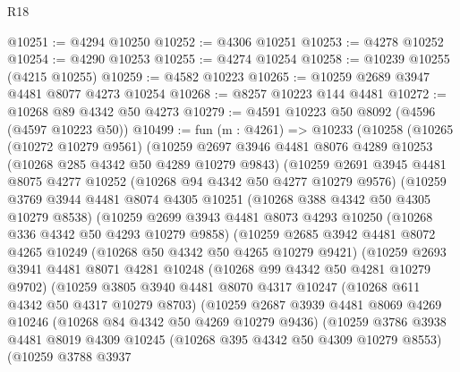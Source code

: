 \begin{lexlean}{R18}
\begin{coremodule}
@10251 := @4294 @10250
@10252 := @4306 @10251
@10253 := @4278 @10252
@10254 := @4290 @10253
@10255 := @4274 @10254
@10258 := @10239 @10255 (@4215 @10255)
@10259 := @4582 @10223
@10265 := @10259 @2689 @3947 @4481 @8077 @4273 @10254
@10268 := @8257 @10223 @144 @4481
@10272 := @10268 @89 @4342 @50 @4273
@10279 := @4591 @10223 @50 @8092 (@4596 (@4597 @10223 @50))
@10499 := fun (m : @4261) =>
  @10233
    (@10258
      (@10265
        (@10272 @10279 @9561)
        (@10259
          @2697
          @3946
          @4481
          @8076
          @4289
          @10253
          (@10268 @285 @4342 @50 @4289 @10279 @9843)
          (@10259
            @2691
            @3945
            @4481
            @8075
            @4277
            @10252
            (@10268 @94 @4342 @50 @4277 @10279 @9576)
            (@10259
              @3769
              @3944
              @4481
              @8074
              @4305
              @10251
              (@10268 @388 @4342 @50 @4305 @10279 @8538)
              (@10259
                @2699
                @3943
                @4481
                @8073
                @4293
                @10250
                (@10268 @336 @4342 @50 @4293 @10279 @9858)
                (@10259
                  @2685
                  @3942
                  @4481
                  @8072
                  @4265
                  @10249
                  (@10268 @50 @4342 @50 @4265 @10279 @9421)
                  (@10259
                    @2693
                    @3941
                    @4481
                    @8071
                    @4281
                    @10248
                    (@10268 @99 @4342 @50 @4281 @10279 @9702)
                    (@10259
                      @3805
                      @3940
                      @4481
                      @8070
                      @4317
                      @10247
                      (@10268 @611 @4342 @50 @4317 @10279 @8703)
                      (@10259
                        @2687
                        @3939
                        @4481
                        @8069
                        @4269
                        @10246
                        (@10268 @84 @4342 @50 @4269 @10279 @9436)
                        (@10259
                          @3786
                          @3938
                          @4481
                          @8019
                          @4309
                          @10245
                          (@10268 @395 @4342 @50 @4309 @10279 @8553)
                          (@10259
                            @3788
                            @3937

\end{coremodule}
\end{lexlean}
